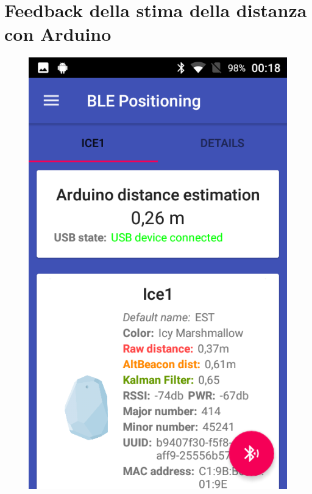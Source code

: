 \newpage
\section{Feedback della stima della distanza con Arduino}
\begin{figure}[ph]
	\centering
	\includegraphics[width=.35\linewidth]{img/app/11.png}
	\caption{}
\end{figure}